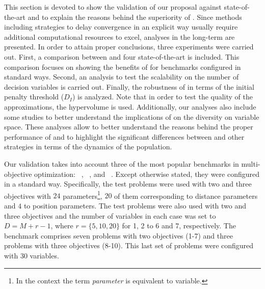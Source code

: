 This section is devoted to show the validation of our proposal against state-of-the-art \MOEAS{} and
to explain the reasons behind the superiority of \AVSDMOEAD{}.
%
%
Since methods including strategies to delay convergence in an explicit way usually require additional computational
resources to excel, analyses in the long-term are presented.
%
In order to attain proper conclusions, three experiments were carried out.
%
First, a comparison between \AVSDMOEAD{} and four state-of-the-art \MOEAS{} is included.
%
This comparison focuses on showing the benefits of \AVSDMOEAD{} for benchmarks 
configured in standard ways.
%
Second, an analysis to test the scalability on the number of decision variables is carried out.
%
Finally, the robustness of \AVSDMOEAD{} in terms of the initial penalty threshold ($D_I$) is analyzed.
%
Note that in order to test the quality of the approximations, the hypervolume is used.
%
Additionally, our analyses also include some studies to better understand
the implications of \AVSDMOEAD{} on the diversity on variable space.
%
These analyses allow to better understand the reasons behind the proper performance of \AVSDMOEAD{}
and to highlight the significant differences between \AVSDMOEAD{} and other strategies in terms of the dynamics
of the population.



Our validation takes into account three of the most popular benchmarks in multi-objective optimization:
\WFG{}~\cite{huband2006review}, \DTLZ{}~\cite{deb2005scalable}, and \UF{}~\cite{zhang2008multiobjective}.
%
Except otherwise stated, they were configured in a standard way.
%
Specifically, the \WFG{} test problems were used with two and three objectives with $24$ 
parameters\footnote{In the \WFG{} context the term \textit{parameter} is equivalent to variable.}, 
$20$ of them corresponding to distance parameters and $4$ to position parameters.
%
The \DTLZ{} test problems were also used with two and three objectives and the number of variables in each
case was set to $D=M+r-1$, where $r=\{5, 10, 20\}$ for \DTLZ{}1, \DTLZ{}2 to \DTLZ{}6 and \DTLZ{}7, respectively.
% 
The \UF{} benchmark comprises seven problems with two objectives (\UF{}1-7) and three problems with three objectives (\UF{}8-10).
%
This last set of problems were configured with $30$ variables.

